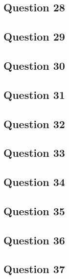 \documentclass[11pt,a4paper]{article}
\begin{document}
\subsection*{Question 28}

\subsection*{Question 29}

\subsection*{Question 30}

\subsection*{Question 31}

\subsection*{Question 32}

\subsection*{Question 33}

\subsection*{Question 34}

\subsection*{Question 35}

\subsection*{Question 36}

\subsection*{Question 37}
\end{document}
